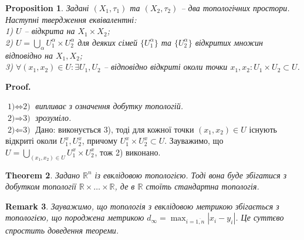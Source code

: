 \documentclass[a4paper, 10pt]{article}
\makeatletter
\theoremstyle{theoremdd}
\newtheorem{theorem}{Theorem}[subsection]
\newtheorem{proposition}[theorem]{Proposition}
\newtheorem{remark}[theorem]{Remark}
\renewenvironment{proof}[1][Proof.\\]{\par
\pushQED{\hfill \qed}%
\normalfont \topsep6\p@\@plus6\p@\relax
\trivlist
\item\relax
{\bfseries
#1\@addpunct{.}}\hspace\labelsep\ignorespaces
}{%
\popQED\endtrivlist\@endpefalse
}
\makeatother
\begin{document}
\begin{proposition}
Задані $(X_1,\tau_1)$ та $(X_2,\tau_2)$ -- два топологічних простори. Наступні твердження еквівалентні:\\
1) $U$ -- відкрита на $X_1 \times X_2$;\\
2) $U = \displaystyle\bigcup_\alpha U_1^\alpha \times U_2^\alpha$ для деяких сімей $\{U_1^\alpha\}$ та $\{U_2^\alpha\}$ відкритих множин відповідно на $X_1,X_2$;\\
3) $\forall (x_1,x_2) \in U: \exists U_1,U_2$ -- відповідно відкриті околи точки $x_1,x_2: U_1 \times U_2 \subset U$.
\end{proposition}

\begin{proof}
$\boxed{\text{1)} \Leftrightarrow \text{2)}}$ \textit{випливає з означення добутку топологій.}
\bigskip \\
$\boxed{\text{2)} \Rightarrow \text{3)}}$ \textit{зрозуміло.}
\bigskip \\
$\boxed{\text{2)} \Leftarrow \text{3)}}$ Дано: виконується 3), тоді для кожної точки $(x_1,x_2) \in U$ існують відкриті околи $U_1^x,U_2^x$, причому $U_1^x \times U_2^x \subset U$. Зауважимо, що $U = \displaystyle\bigcup_{(x_1,x_2) \in U} U_1^x \times U_2^x$, тож 2) виконано.
\end{proof}

\begin{theorem}
Задано $\mathbb{R}^n$ із евклідовою топологією. Тоді вона буде збігатися з добутком топології $\mathbb{R} \times \dots \times \mathbb{R}$, де в $\mathbb{R}$ стоїть стандартна топологія.
\end{theorem}

\begin{remark}
Зауважимо, що топологія з евклідовою метрикою збігається з топологією, що породжена метрикою $d_\infty = \displaystyle\max_{i = \overline{1,n}} |x_i-y_i|$. Це суттєво спростить доведення теореми.
\end{remark}
\end{document}
